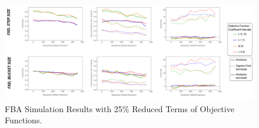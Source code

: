\begin{landscape}
	\vspace*{\fill}
	\begin{figure}[ht]
		\centering
		\includegraphics[width=1\hsize]{../images/results-obj_func_terms_reduced25-simulation-results.png}
		\caption{FBA Simulation Results with 25\% Reduced Terms of Objective Functions.}
		\label{figure-supplements-obj_func-terms-reduced25}
	\end{figure}
	\vspace*{\fill}
\end{landscape}